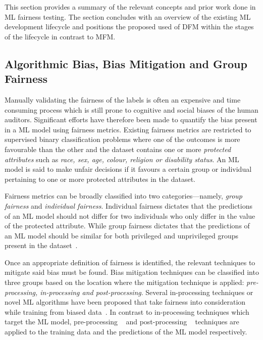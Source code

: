\documentclass[conference,review,anonymous]{IEEEtran}
\begin{document}
This section provides a summary of the relevant concepts and prior
work done in ML fairness testing. The section concludes with an
overview of the existing ML development lifecycle and positions the
proposed used of DFM within the stages of the lifecycle in contrast to
MFM.

\subsection{Algorithmic Bias, Bias Mitigation and Group Fairness}\label{sec:bias-fairness}

Manually validating the fairness of the labels is often an expensive
and time consuming process which is still prone to cognitive and
social biases of the human auditors. Significant efforts have
therefore been made to quantify the bias present in a ML model using
fairness metrics. Existing fairness metrics are restricted to
supervised binary classification problems where one of the outcomes is
more favourable than the other and the dataset contains one or more
\emph{protected attributes} such as \emph{race, sex, age, colour,
religion or disability status}. An ML model is said to make unfair
decisions if it favours a certain group or individual pertaining to
one or more protected attributes in the dataset.

Fairness metrics can be broadly classified into two
categories---namely, \emph{group fairness} and \emph{individual
fairness}. Individual fairness dictates that the predictions of an ML
model should not differ for two individuals who only differ in the
value of the protected attribute. While group fairness dictates that
the predictions of an ML model should be similar for both privileged
and unprivileged groups present in the
dataset \cite{castelnovo2022clarification,hellman2020measuring,mitchell2021algorithmic,kusner2017counterfactual,grgic2016case,dwork2012fairness,barocas2019fairness,barocas2016big,hardt2016equality,binns2018fairness,verma2018fairness,saxena2019fairness}.

Once an appropriate definition of fairness is identified, the relevant
techniques to mitigate said bias must be found. Bias mitigation
techniques can be classified into three groups based on the location
where the mitigation technique is applied: \emph{pre-processing,
in-processing and post-processing}. Several in-processing techniques
or novel ML algorithms have been proposed that take fairness into
consideration while training from biased
data \cite{zhang2018mitigating,agarwal2018reductions,kearns2018preventing,kamishima2012fairness}.
In contrast to in-processing techniques which target the ML model,
pre-processing
 \cite{feldman2015certifying,zemel2013learning,calmon2017optimized,kamiran2012data}
and post-processing
 \cite{pleiss2017fairness,hardt2016equality,kamiran2012decision}
techniques are applied to the training data and the predictions of the
ML model respectively.
\end{document}
